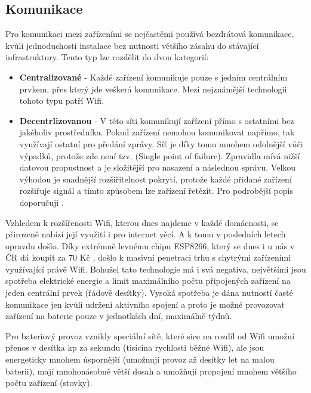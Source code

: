 \subsection{Komunikace}    %
Pro komunikaci mezi zařízeními se nejčastěmi používá bezdrátová komunikace, kvůli jednoduchosti instalace bez nutnosti většího zásahu do stávající infrastruktury. Tento typ lze rozdělit do dvou kategorií:
\begin{itemize}
    \item \textbf{Centralizované} - Každé zařízení komunikuje pouze s jedním centrálním prvkem, přes který jde veškerá komunikace. Mezi nejznámější technologii tohoto typu patří Wifi.
    \item \textbf{Decentrlizovanou} - V této síti komunikují zařízení přímo s ostatními bez jakéholiv prostředníka. Pokud zařízení nemohou komunikovat napřímo, tak využívají ostatní pro předání zprávy. Síť je díky tomu mnohem odolnější vůči výpadků, protože zde není tzv.  (Single point of failure). Zpravidla mívá nižší datovou propustnost a je složitější pro nasazení a následnou správu. Velkou výhodou je snadnější rozšiřitelnost pokrytí, protože každé přidané zařízení rozšiřuje signál a tímto způsobem lze zařízení řetězit. Pro podrobější popis doporučuji \cite{mesh}.
\end{itemize}
Vzhledem k rozšířenosti Wifi, kterou dnes najdeme v každé domácnosti, se přirozeně nabízí její využití i pro internet věcí. A k tomu v posledních letech opravdu došlo. Díky extrémně levnému chipu ESP8266, který se dnes i u nás v ČR dá koupit za 70 Kč \cite{hadex}, došlo k masivní penetraci trhu s chytrými zařízeními využívající právě Wifi. Bohužel tato technologie má i svá negativa, největšími jsou spotřeba elektrické energie a limit maximálního počtu připojených zařízení na jeden centrální prvek (řádově desítky). Vysoká spotřeba je dána nutností časté komunikace jen kvůli udržení aktivního spojení a proto je možné provozovat zařízení na baterie pouze v jednotkách dní, maximálně týdnů.

Pro bateriový provoz vznikly speciální sítě, které sice na rozdíl od Wifi umožní přenos v desítka kp za sekundu (tisícina rychlosti běžné Wifi), ale jsou energeticky mnohem úspornější \cite{wifi-vs-ble} (umožnují provoz až desítky let na malou baterii), mají mnohonásobně větší dosah a umožňují propojení mnohem většího počtu zařízení (stovky).

